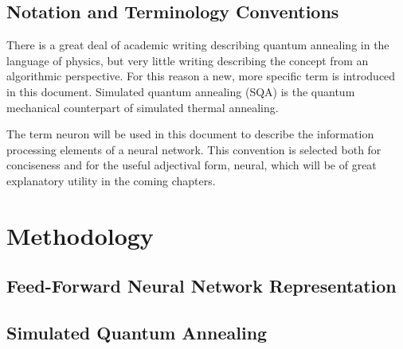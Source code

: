 \documentclass[11pt]{afthesis}
\begin{document}
	
	
	
	\section{Notation and Terminology Conventions}
	
	There is a great deal of academic writing describing quantum annealing in the language of physics, but very little writing describing the concept from an algorithmic perspective. For this reason a new, more specific term is introduced in this document. Simulated quantum annealing (SQA) is the quantum mechanical counterpart of simulated thermal annealing. 
	
	
	The term neuron will be used in this document to describe the information processing elements of a neural network. This convention is selected both for conciseness and for the useful adjectival form, neural, which will be of great explanatory utility in the coming chapters.
	
	
	
	
	\chapter{Methodology}
	
	\section{Feed-Forward Neural Network Representation}
	
	\section{Simulated Quantum Annealing}
	
\end{document}
